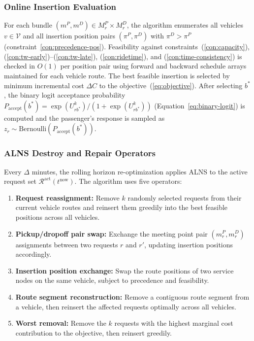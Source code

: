 \subsubsection{Online Insertion Evaluation}

For each bundle $(m^P, m^D) \in M_r^P \times M_r^D$, the algorithm enumerates all
vehicles $v \in \mathcal{V}$ and all insertion position pairs $(\pi^P, \pi^D)$ with
$\pi^D > \pi^P$ (constraint~\ref{con:precedence-pos}). Feasibility against
constraints~(\ref{con:capacity}), (\ref{con:tw-early})--(\ref{con:tw-late}),
(\ref{con:ridetime}), and (\ref{con:time-consistency}) is checked in $O(1)$ per position
pair using forward and backward schedule arrays maintained for each vehicle route. The
best feasible insertion is selected by minimum incremental cost $\Delta C$ to the
objective~(\ref{eq:objective}). After selecting $b^*$, the binary logit acceptance probability
$P_{\text{accept}}(b^*) = \exp(U_{rb^*}^k) / (1 + \exp(U_{rb^*}^k))$
(Equation~\ref{eq:binary-logit}) is computed and the passenger's response is sampled
as $z_r \sim \text{Bernoulli}(P_{\text{accept}}(b^*))$.

\subsubsection{ALNS Destroy and Repair Operators}

Every $\Delta$ minutes, the rolling horizon re-optimization applies ALNS
\citep{ropke2006} to the active request set $\mathcal{R}^{\text{act}}(t^{\text{now}})$.
The algorithm uses five operators:

\begin{enumerate}
  \item \textbf{Request reassignment:} Remove $k$ randomly selected requests from their
        current vehicle routes and reinsert them greedily into the best feasible positions
        across all vehicles.
  \item \textbf{Pickup/dropoff pair swap:} Exchange the meeting point pair
        $(m_r^P, m_r^D)$ assignments between two requests $r$ and $r'$, updating
        insertion positions accordingly.
  \item \textbf{Insertion position exchange:} Swap the route positions of two service
        nodes on the same vehicle, subject to precedence and feasibility.
  \item \textbf{Route segment reconstruction:} Remove a contiguous route segment from a
        vehicle, then reinsert the affected requests optimally across all vehicles.
  \item \textbf{Worst removal:} Remove the $k$ requests with the highest marginal cost
        contribution to the objective, then reinsert greedily.
\end{enumerate}

